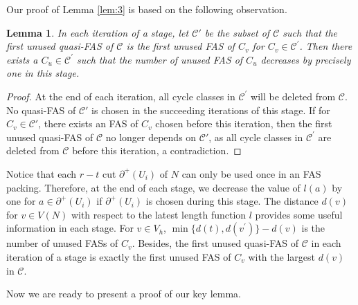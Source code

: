 \documentclass[11pt]{article}
\newtheorem{lemma}[theorem]{Lemma}
\begin{document}
Our proof of Lemma \ref{lem:3} is based on the following observation. 

\begin{lemma}
\label{lem:4} 
In each iteration of a stage, let $\mathcal{C}'$ be the subset of $\mathcal{C}$ such that the first unused quasi-FAS of $\mathcal{C}$ is the first unused FAS of $C_v$ for $C_v \in\mathcal{C}^\prime$. Then there exists a $C_u\in \mathcal{C}^\prime$ such that the number of unused FAS of $C_u$ decreases by precisely one in this stage.
\end{lemma}

\begin{proof}
At the end of each iteration, all cycle classes in $\mathcal{C}^\prime$ will be deleted from $\mathcal{C}$. No quasi-FAS of $\mathcal{C}'$ is chosen in the succeeding iterations of this stage. If for $C_v\in\mathcal{C}'$, there exists an FAS of $C_v$ chosen before this iteration, then the first unused quasi-FAS of $\mathcal{C}$ no longer depends on $\mathcal{C}'$, as all cycle classes in $\mathcal{C}^\prime$ are deleted from $\mathcal{C}$ before this iteration, a contradiction.
\end{proof}

Notice that each $r-t$ cut $\partial^+(U_i)$ of $N$ can only be used once in an FAS packing. Therefore, at the end of each stage, we decrease the value of $l(a)$ by one for $a\in \partial^+(U_i)$ if $\partial^+(U_i)$ is chosen during this stage. The distance $d(v)$ for $v\in V(N)$ with respect to the latest length function $l$ provides some useful information in each stage. For $v\in V_h$, $\min\{d(t),d(v^\prime)\}-d(v)$ is the number of unused FASs of $C_v$. Besides, the first unused quasi-FAS of $\mathcal{C}$ in each iteration of a stage is exactly the first unused FAS of $C_v$ with the largest $d(v)$ in $\mathcal{C}$.

Now we are ready to present a proof of our key lemma.
\end{document}
